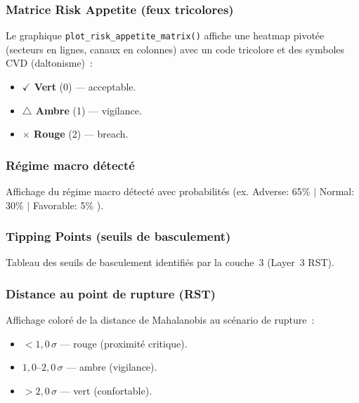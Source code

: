\documentclass[12pt,a4paper]{article}
\begin{document}
\subsubsection{Matrice Risk Appetite (feux tricolores)}

Le graphique \texttt{plot\_risk\_appetite\_matrix()} affiche une heatmap pivot\'ee (secteurs en lignes, canaux en colonnes) avec un code tricolore et des symboles CVD (daltonisme)~:
\begin{itemize}[leftmargin=2em]
    \item \textcolor{accentgreen}{\textbf{$\checkmark$ Vert}} (0) --- acceptable.
    \item \textcolor{accentorange}{\textbf{$\triangle$ Ambre}} (1) --- vigilance.
    \item \textcolor{accentred}{\textbf{$\times$ Rouge}} (2) --- breach.
\end{itemize}

\subsubsection{R\'egime macro d\'etect\'e}

Affichage du r\'egime macro d\'etect\'e avec probabilit\'es (ex. \og Adverse: 65\% $|$ Normal: 30\% $|$ Favorable: 5\% \fg).

\subsubsection{Tipping Points (seuils de basculement)}

Tableau des seuils de basculement identifi\'es par la couche~3 (Layer~3 RST).

\subsubsection{Distance au point de rupture (RST)}

Affichage color\'e de la distance de Mahalanobis au sc\'enario de rupture~:
\begin{itemize}[leftmargin=2em]
    \item $< 1{,}0\,\sigma$ --- \textcolor{accentred}{rouge} (proximit\'e critique).
    \item $1{,}0$--$2{,}0\,\sigma$ --- \textcolor{accentorange}{ambre} (vigilance).
    \item $> 2{,}0\,\sigma$ --- \textcolor{accentgreen}{vert} (confortable).
\end{itemize}
\end{document}
